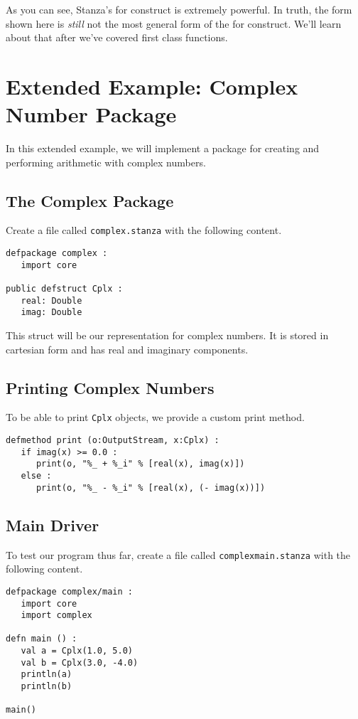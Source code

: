 \documentclass[10pt,oneside]{book}
\begin{document}
As you can see, Stanza's for construct is extremely powerful. In truth, the form shown here is {\em still} not the most general form of the for construct. We'll learn about that after we've covered first class functions.

\section{Extended Example: Complex Number Package}
In this extended example, we will implement a package for creating and performing arithmetic with complex numbers. 

\subsection*{The Complex Package}
Create a file called \texttt{\frenchspacing complex.stanza} with the following content.
\begin{lstlisting}
defpackage complex :
   import core

public defstruct Cplx :
   real: Double
   imag: Double
\end{lstlisting}
This struct will be our representation for complex numbers. It is stored in cartesian form and has real and imaginary components. 

\subsection*{Printing Complex Numbers}
To be able to print \texttt{\frenchspacing Cplx} objects, we provide a custom print method.
\begin{lstlisting}
defmethod print (o:OutputStream, x:Cplx) :
   if imag(x) >= 0.0 :
      print(o, "%_ + %_i" % [real(x), imag(x)])
   else :
      print(o, "%_ - %_i" % [real(x), (- imag(x))])
\end{lstlisting}

\subsection*{Main Driver}
To test our program thus far, create a file called \texttt{\frenchspacing complexmain.stanza} with the following content.
\begin{lstlisting}
defpackage complex/main :
   import core
   import complex

defn main () :
   val a = Cplx(1.0, 5.0)
   val b = Cplx(3.0, -4.0)
   println(a)
   println(b)

main()
\end{lstlisting}
\end{document}
